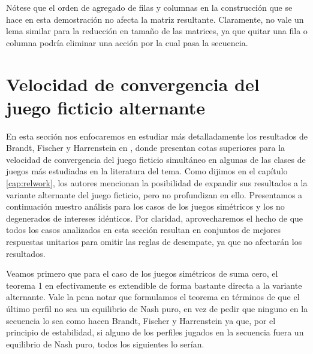 Nótese que el orden de agregado de filas y columnas en la construcción que se hace en esta demostración no afecta la matriz resultante. Claramente, no vale un lema similar para la reducción en tamaño de las matrices, ya que quitar una fila o columna podría eliminar una acción por la cual pasa la secuencia.


\section{Velocidad de convergencia del juego ficticio alternante} \label{sec:aportes:velocidad}

En esta sección nos enfocaremos en estudiar más detalladamente los resultados de Brandt, Fischer y Harrenstein en \cite{brandt:rate:convergence}, donde presentan cotas superiores para la velocidad de convergencia del juego ficticio simultáneo en algunas de las clases de juegos más estudiadas en la literatura del tema. Como dijimos en el capítulo \ref{cap:relwork}, los autores mencionan la posibilidad de expandir sus resultados a la variante alternante del juego ficticio, pero no profundizan en ello. Presentamos a continuación nuestro análisis para los casos de los juegos simétricos y los no degenerados de intereses idénticos. Por claridad, aprovecharemos el hecho de que todos los casos analizados en esta sección resultan en conjuntos de mejores respuestas unitarios para omitir las reglas de desempate, ya que no afectarán los resultados.

Veamos primero que para el caso de los juegos simétricos de suma cero, el teorema 1 en \cite{brandt:rate:convergence} efectivamente es extendible de forma bastante directa a la variante alternante. Vale la pena notar que formulamos el teorema en términos de que el último perfil no sea un equilibrio de Nash puro, en vez de pedir que ninguno en la secuencia lo sea como hacen Brandt, Fischer y Harrenstein ya que, por el principio de estabilidad, si alguno de los perfiles jugados en la secuencia fuera un equilibrio de Nash puro, todos los siguientes lo serían.

